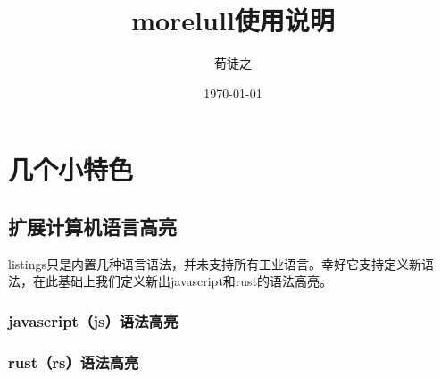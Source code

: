 \documentclass{morelull}
\title{morelull使用说明}
\author{荀徒之}
\date{\today}
\begin{document}
\maketitle
\tableofcontents

\section{几个小特色}
\subsection{扩展计算机语言高亮}

listings只是内置几种语言语法，并未支持所有工业语言。幸好它支持定义新语法，在此基础上我们定义新出javascript和rust的语法高亮。

\subsubsection{javascript（js）语法高亮}


\subsubsection{rust（rs）语法高亮}

\end{document}
